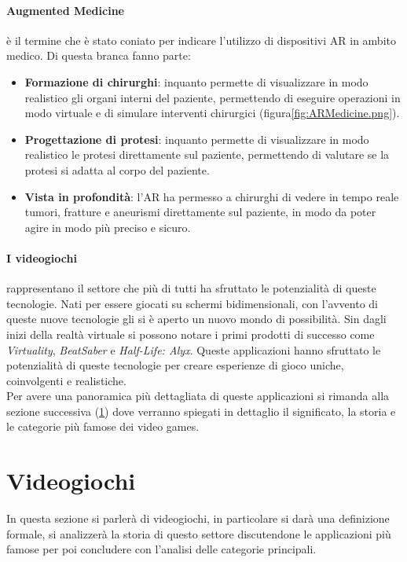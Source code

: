         \paragraph{Augmented Medicine} è il termine che è stato coniato per indicare l'utilizzo di dispositivi AR in ambito medico. Di questa branca fanno parte:
            \begin{itemize}
                \item \textbf{Formazione di chirurghi}: inquanto permette di visualizzare in modo realistico gli organi 
                    interni del paziente, permettendo di eseguire operazioni in modo virtuale e di simulare interventi chirurgici (figura\ref{fig:ARMedicine.png}).
                \item \textbf{Progettazione di protesi}: inquanto permette di visualizzare in modo realistico le protesi 
                    direttamente sul paziente, permettendo di valutare se la protesi si adatta al corpo del paziente.
                \item \textbf{Vista in profondità}: l'AR ha permesso a chirurghi di vedere in tempo reale tumori, fratture e aneurismi direttamente sul paziente, in modo da poter 
                    agire in modo più preciso e sicuro.
            \end{itemize}

        \paragraph{I videogiochi} rappresentano il settore che più di tutti ha sfruttato le potenzialità di queste tecnologie. Nati per essere giocati 
            su schermi bidimensionali, con l'avvento di queste nuove tecnologie gli si è aperto un nuovo mondo di possibilità. Sin dagli inizi della realtà virtuale si possono notare
            i primi prodotti di successo come \textit{Virtuality}, \textit{BeatSaber} e \textit{Half-Life: Alyx}. Queste applicazioni hanno sfruttato le potenzialità di queste
            tecnologie per creare esperienze di gioco uniche, coinvolgenti e realistiche.\\
            Per avere una panoramica più dettagliata di queste applicazioni si rimanda alla sezione successiva (\ref{sec:Videogiochi}) dove verranno spiegati in dettaglio
            il significato, la storia e le categorie più famose dei video games.

\section{Videogiochi}\label{sec:Videogiochi}
    In questa sezione si parlerà di videogiochi, in particolare si darà una definizione formale, si analizzerà la storia di questo settore discutendone le applicazioni più famose per 
    poi concludere con l'analisi delle categorie principali.
    

